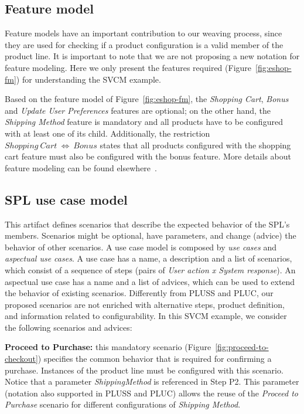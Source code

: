 \subsection{Feature model}

Feature models have an important contribution to our
weaving process, since they are used for checking if a product
configuration is a valid member of the product line. It is important to note
that we are not proposing a new notation for feature modeling. Here we
only present the features required (Figure~\ref{fig:eshop-fm}) for
understanding the SVCM example.

Based on the feature model of Figure~\ref{fig:eshop-fm}, the \emph{Shopping
Cart}, \emph{Bonus} and \emph{Update User Preferences} features are optional; on
the other hand, the \emph{Shipping Method} feature is mandatory and all products
have to be configured with at least one of its child. Additionally, the
restriction $Shopping\ Cart\ \Leftrightarrow\ Bonus$ states that all
products configured with the shopping cart feature must also be configured with
the bonus feature. More details about feature modeling can be found
elsewhere~\cite{Gheyi:2006aa,Czarnecki:2000aa}.


\subsection{SPL use case model}

This artifact defines scenarios that describe the expected behavior of the SPL's
members. Scenarios might be optional, have parameters, and change (advice) the
behavior of other scenarios. A use case model is composed by \emph{use cases} and
\emph{aspectual use cases}. A use case has a name, a description and a list of
scenarios, which consist of a sequence of steps (pairs of \emph{User action x
System response}). An aspectual use case has a name and a list of advices, which
can be used to extend the behavior of existing scenarios. Differently from
PLUSS and PLUC, our proposed scenarios are not enriched with alternative steps,
product definition, and information related to configurability.
In this SVCM example, we consider the following scenarios and advices:

{\bf Proceed to Purchase:} this mandatory scenario
(Figure~\ref{fig:proceed-to-checkout}) specifies the common behavior that is
required for confirming a purchase. Instances of the product line must be
configured with this scenario. Notice that a parameter
\emph{ShippingMethod} is referenced in Step P2. This parameter (notation
also supported in PLUSS and PLUC) allows the reuse of the \emph{Proceed to
Purchase} scenario for different configurations of \emph{Shipping Method}.

